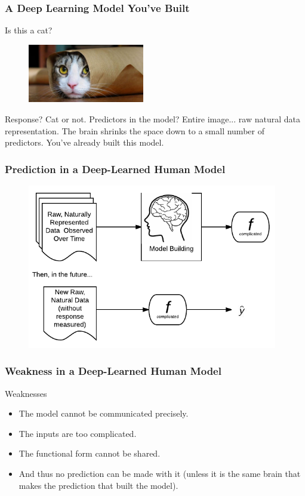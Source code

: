 \documentclass[handout]{beamer}
\begin{document}
\begin{frame}\frametitle{A Deep Learning Model You've Built}

Is this a cat?

\begin{figure}
\centering
\includegraphics[width=2in]{cat.jpg}
\end{figure}


Response? Cat or not. Predictors in the model? Entire image... raw natural data representation. The brain shrinks the space down to a small number of predictors. You've already built this model. 

	
\end{frame}

\begin{frame}\frametitle{Prediction in a Deep-Learned Human Model}


\begin{figure}
\centering
\includegraphics[width=4.3in]{human_learning_weakness}
\end{figure}

\end{frame}

\begin{frame}\frametitle{Weakness in a Deep-Learned Human Model}

\begin{block}{Weaknesses}
\begin{itemize}
\item The model cannot be communicated precisely.
\item The inputs are too complicated.
\item The functional form cannot be shared.
\item And thus no prediction can be made with it (unless it is the same brain that makes the prediction that built the model).
\end{itemize}
\end{block}


	
\end{frame}
\end{document}

